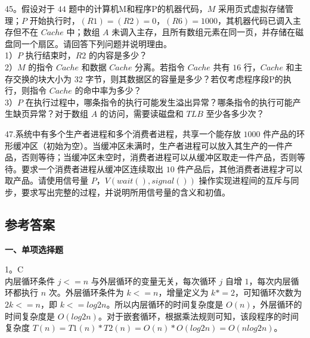 45。假设对于 $44$ 题中的计算机M和程序P的机器代码，$M$ 采用页式虚拟存储管理；$P$ 开始执行时，$(R1)=(R2)=0$，$(R6)=1000$，其机器代码已调入主存但不在 $Cache$ 中；数组 $A$ 未调入主存，且所有数组元素在同一页，并存储在磁盘同一个扇区。请回答下列问题并说明理由。 \\
1）$P$ 执行结束时，$R2$ 的内容是多少？  \\
2）$M$ 的指令 $Cache$ 和数据 $Cache$ 分离。若指令 $Cache$ 共有 $16$ 行，$Cache$ 和主存交换的块大小为 $32$ 字节，则其数据区的容量是多少？若仅考虑程序段P的执行，则指令 $Cache$ 的命中率为多少？  \\
3）$P$ 在执行过程中，哪条指令的执行可能发生溢出异常？哪条指令的执行可能产生缺页异常？对于数组 $A$ 的访问，需要读磁盘和 $TLB$ 至少各多少次？

47.系统中有多个生产者进程和多个消费者进程，共享一个能存放 $1000$ 件产品的环形缓冲区（初始为空）。当缓冲区未满时，生产者进程可以放入其生产的一件产品，否则等待；当缓冲区未空时，消费者进程可以从缓冲区取走一件产品，否则等待。要求一个消费者进程从缓冲区连续取出 $10$ 件产品后，其他消费者进程才可以取产品。请使用信号量 $P$，$V(wait(),signal())$ 操作实现进程间的互斥与同步，要求写出完整的过程，并说明所用信号量的含义和初值。

\subsection{参考答案}

\textbf{一、单项选择题}

1。C \\
内层循环条件 $j<=n$ 与外层循环的变量无关，每次循环 $j$ 自增 $1$，每次内层循环都执行 $n$ 次。外层循环条件为 $k<=n$，增量定义为 $k*=2$，可知循环次数为 $2k<=n$，即 $k<=log2n$。所以内层循环的时间复杂度是 $O(n)$，外层循环的时间复杂度是 $O(log2n)$。对于嵌套循环，根据乘法规则可知，该段程序的时间复杂度 $T(n)=T1(n)*T2(n)=O(n)*O(log2n)=O(nlog2n)$。

